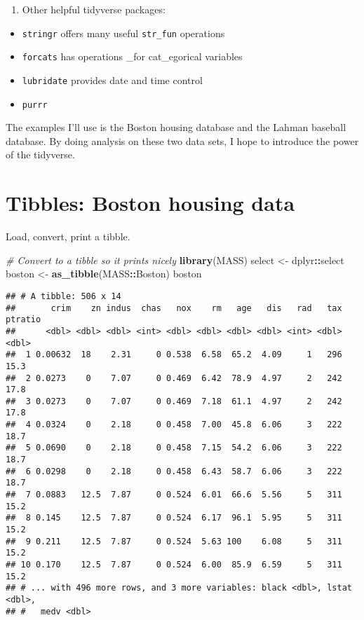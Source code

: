 \documentclass[]{book}
\newenvironment{Shaded}{\begin{snugshade}}{\end{snugshade}}
\newcommand{\KeywordTok}[1]{\textcolor[rgb]{0.13,0.29,0.53}{\textbf{#1}}}
\newcommand{\StringTok}[1]{\textcolor[rgb]{0.31,0.60,0.02}{#1}}
\newcommand{\CommentTok}[1]{\textcolor[rgb]{0.56,0.35,0.01}{\textit{#1}}}
\newcommand{\OperatorTok}[1]{\textcolor[rgb]{0.81,0.36,0.00}{\textbf{#1}}}
\newcommand{\NormalTok}[1]{#1}
\providecommand{\tightlist}{%
  \setlength{\itemsep}{0pt}\setlength{\parskip}{0pt}}
\begin{document}
\begin{enumerate}
\def\labelenumi{\arabic{enumi}.}
\setcounter{enumi}{6}
\tightlist
\item
  Other helpful tidyverse packages:
\end{enumerate}

\begin{itemize}
\tightlist
\item
  \texttt{stringr} offers many useful \texttt{str\_fun} operations
\item
  \texttt{forcats} has operations \_for cat\_egorical variables
\item
  \texttt{lubridate} provides date and time control
\item
  \texttt{purrr}
\end{itemize}

The examples I'll use is the Boston housing database and the Lahman
baseball database. By doing analysis on these two data sets, I hope to
introduce the power of the tidyverse.

\section{Tibbles: Boston housing
data}\label{tibbles-boston-housing-data}

Load, convert, print a tibble.

\begin{Shaded}
\begin{Highlighting}[]
\CommentTok{# Convert to a tibble so it prints nicely}
\KeywordTok{library}\NormalTok{(MASS)}
\NormalTok{select <-}\StringTok{ }\NormalTok{dplyr}\OperatorTok{::}\NormalTok{select}
\NormalTok{boston <-}\StringTok{ }\KeywordTok{as_tibble}\NormalTok{(MASS}\OperatorTok{::}\NormalTok{Boston)}
\NormalTok{boston}
\end{Highlighting}
\end{Shaded}

\begin{verbatim}
## # A tibble: 506 x 14
##       crim    zn indus  chas   nox    rm   age   dis   rad   tax ptratio
##      <dbl> <dbl> <dbl> <int> <dbl> <dbl> <dbl> <dbl> <int> <dbl>   <dbl>
##  1 0.00632  18    2.31     0 0.538  6.58  65.2  4.09     1   296    15.3
##  2 0.0273    0    7.07     0 0.469  6.42  78.9  4.97     2   242    17.8
##  3 0.0273    0    7.07     0 0.469  7.18  61.1  4.97     2   242    17.8
##  4 0.0324    0    2.18     0 0.458  7.00  45.8  6.06     3   222    18.7
##  5 0.0690    0    2.18     0 0.458  7.15  54.2  6.06     3   222    18.7
##  6 0.0298    0    2.18     0 0.458  6.43  58.7  6.06     3   222    18.7
##  7 0.0883   12.5  7.87     0 0.524  6.01  66.6  5.56     5   311    15.2
##  8 0.145    12.5  7.87     0 0.524  6.17  96.1  5.95     5   311    15.2
##  9 0.211    12.5  7.87     0 0.524  5.63 100    6.08     5   311    15.2
## 10 0.170    12.5  7.87     0 0.524  6.00  85.9  6.59     5   311    15.2
## # ... with 496 more rows, and 3 more variables: black <dbl>, lstat <dbl>,
## #   medv <dbl>
\end{verbatim}
\end{document}

